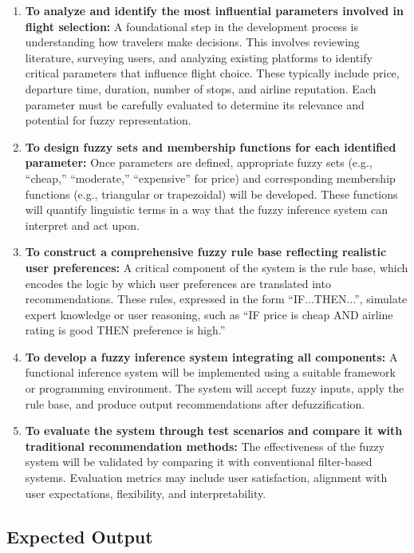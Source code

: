 \documentclass[a4paper]{article}
\begin{document}
\begin{enumerate}
\item \textbf{To analyze and identify the most influential parameters involved in flight selection: }
A foundational step in the development process is understanding how travelers make decisions. This involves reviewing literature, surveying users, and analyzing existing platforms to identify critical parameters that influence flight choice. These typically include price, departure time, duration, number of stops, and airline reputation. Each parameter must be carefully evaluated to determine its relevance and potential for fuzzy representation.

\item \textbf{To design fuzzy sets and membership functions for each identified parameter: }
Once parameters are defined, appropriate fuzzy sets (e.g., “cheap,” “moderate,” “expensive” for price) and corresponding membership functions (e.g., triangular or trapezoidal) will be developed. These functions will quantify linguistic terms in a way that the fuzzy inference system can interpret and act upon.

\item \textbf{To construct a comprehensive fuzzy rule base reflecting realistic user preferences: }
A critical component of the system is the rule base, which encodes the logic by which user preferences are translated into recommendations. These rules, expressed in the form “IF...THEN...”, simulate expert knowledge or user reasoning, such as “IF price is cheap AND airline rating is good THEN preference is high.”

\item \textbf{To develop a fuzzy inference system integrating all components: }
A functional inference system will be implemented using a suitable framework or programming environment. The system will accept fuzzy inputs, apply the rule base, and produce output recommendations after defuzzification.

\item \textbf{To evaluate the system through test scenarios and compare it with traditional recommendation methods: }
The effectiveness of the fuzzy system will be validated by comparing it with conventional filter-based systems. Evaluation metrics may include user satisfaction, alignment with user expectations, flexibility, and interpretability.

\end{enumerate}

\subsection*{Expected Output}
\end{document}
